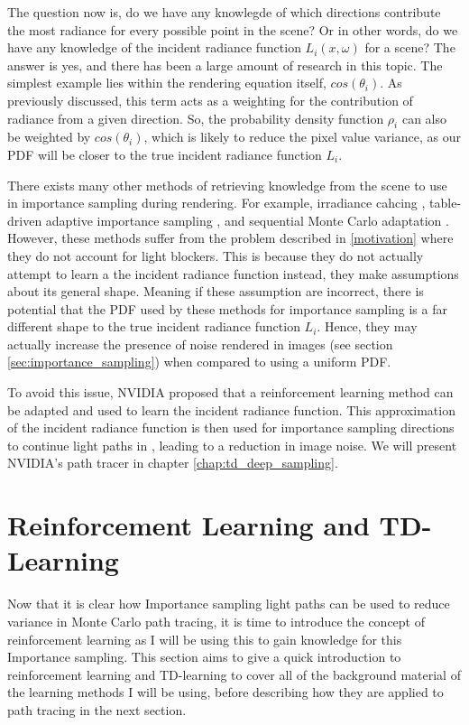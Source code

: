 \documentclass[../dissertation.tex]{subfiles}
\begin{document}
The question now is, do we have any knowlegde of which directions contribute the most radiance for every possible point in the scene? Or in other words, do we have any knowledge of the incident radiance function $L_i(x, \omega)$ for a scene? The answer is yes, and there has been a large amount of research in this topic. The simplest example lies within the rendering equation itself, $cos(\theta_i)$. As previously discussed, this term acts as a weighting for the contribution of radiance from a given direction. So, the probability density function $\rho_i$ can also be weighted by $cos(\theta_i)$, which is likely to reduce the pixel value variance, as our PDF will be closer to the true incident radiance function $L_i$. 

There exists many other methods of retrieving knowledge from the scene to use in importance sampling during rendering. For example, irradiance cahcing \cite{bashford2012significance}, table-driven adaptive importance sampling \cite{cline2008table}, and sequential Monte Carlo adaptation \cite{pegoraro2008towards}. However, these methods suffer from the problem described in \ref{motivation} where they do not account for light blockers. This is because they do not actually attempt to learn a the incident radiance function instead, they make assumptions about its general shape. Meaning if these assumption are incorrect, there is potential that the PDF used by these methods for importance sampling is a far different shape to the true incident radiance function $L_i$. Hence, they may actually increase the presence of noise rendered in images (see section \ref{sec:importance_sampling}) when compared to using a uniform PDF. 

To avoid this issue, NVIDIA proposed that a reinforcement learning method can be adapted and used to learn the incident radiance function. This approximation of the incident radiance function is then used for importance sampling directions to continue light paths in \cite{dahm2017learning}, leading to a reduction in image noise. We will present NVIDIA's path tracer in chapter \ref{chap:td_deep_sampling}.


\section{Reinforcement Learning and TD-Learning}
Now that it is clear how Importance sampling light paths can be used to reduce variance in Monte Carlo path tracing, it is time to introduce the concept of reinforcement learning as I will be using this to gain knowledge for this Importance sampling. This section aims to give a quick introduction to reinforcement learning and TD-learning to cover all of the background material of the learning methods I will be using, before describing how they are applied to path tracing in the next section.
\end{document}
